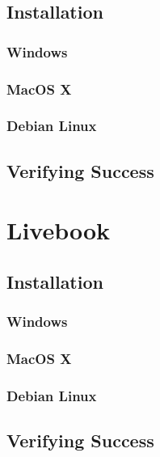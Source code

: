 \subsection{Installation}
\subsubsection{Windows}
\subsubsection{MacOS X}
\subsubsection{Debian Linux}
\subsection{Verifying Success}

\section{Livebook}

\subsection{Installation}
\subsubsection{Windows}
\subsubsection{MacOS X}
\subsubsection{Debian Linux}
\subsection{Verifying Success}
